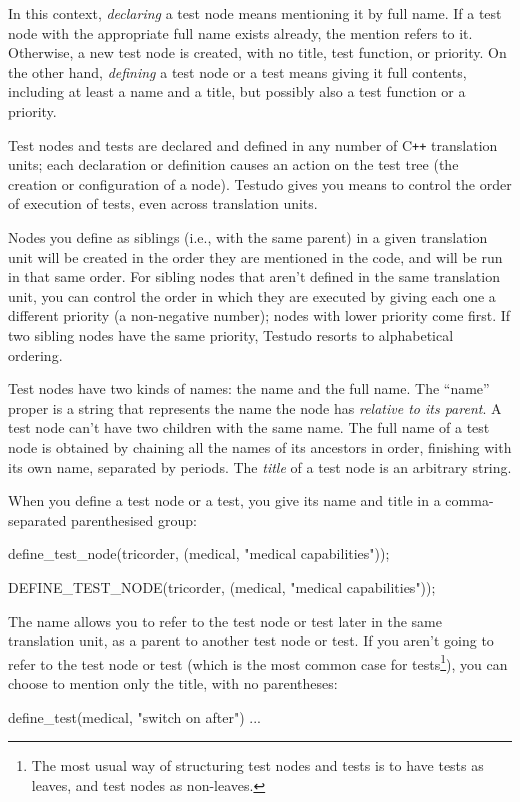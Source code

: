 \documentclass[twoside, a4paper, article]{memoir}
\newcommand*\Cpp{C\texttt{++}}
\begin{document}
In this context, \emph{declaring} a test node means mentioning it by full name.
If a test node with the appropriate full name exists already, the mention
refers to it.  Otherwise, a new test node is created, with no title, test
function, or priority.  On the other hand, \emph{defining} a test node or a
test means giving it full contents, including at least a name and a title, but
possibly also a test function or a priority.

Test nodes and tests are declared and defined in any number of \Cpp{}
translation units; each declaration or definition causes an action on the test
tree (the creation or configuration of a node).  Testudo gives you means to
control the order of execution of tests, even across translation units.

Nodes you define as siblings (i.e., with the same parent) in a given
translation unit will be created in the order they are mentioned in the code,
and will be run in that same order.  For sibling nodes that aren't defined in
the same translation unit, you can control the order in which they are executed
by giving each one a different priority (a non-negative number); nodes with
lower priority come first.  If two sibling nodes have the same priority,
Testudo resorts to alphabetical ordering.

Test nodes have two kinds of names: the name and the full name.  The ``name''
proper is a string that represents the name the node has \emph{relative to its
  parent}.  A test node can't have two children with the same name.  The full
name of a test node is obtained by chaining all the names of its ancestors in
order, finishing with its own name, separated by periods.  The \emph{title} of
a test node is an arbitrary string.

When you define a test node or a test, you give its name and title in a
comma-separated parenthesised group:
\begin{cpplisting}
define_test_node(tricorder,
                 (medical, "medical capabilities"));
\end{cpplisting}

\begin{cpplisting}
DEFINE_TEST_NODE(tricorder,
                 (medical, "medical capabilities"));
\end{cpplisting}

The name allows you to refer to the test node or test later in the same
translation unit, as a parent to another test node or test.  If you aren't
going to refer to the test node or test (which is the most common case for
tests\footnote{The most usual way of structuring test nodes and tests is to
  have tests as leaves, and test nodes as non-leaves.}), you can choose to
mention only the title, with no parentheses:
\begin{cpplisting}
define_test(medical, "switch on after") {
  ...
}
\end{cpplisting}
\end{document}
